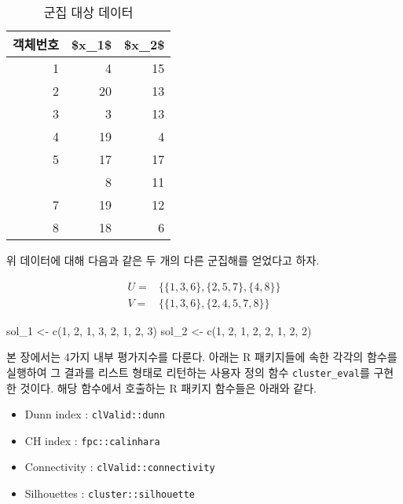 \documentclass[
]{book}
\newenvironment{Shaded}{\begin{snugshade}}{\end{snugshade}}
\newcommand{\DecValTok}[1]{\textcolor[rgb]{0.00,0.00,0.81}{#1}}
\newcommand{\FunctionTok}[1]{\textcolor[rgb]{0.00,0.00,0.00}{#1}}
\newcommand{\NormalTok}[1]{#1}
\newcommand{\OtherTok}[1]{\textcolor[rgb]{0.56,0.35,0.01}{#1}}
\providecommand{\tightlist}{%
  \setlength{\itemsep}{0pt}\setlength{\parskip}{0pt}}
\begin{document}
\begin{table}

\caption{\label{tab:cluster-eval-data}군집 대상 데이터}
\centering
\begin{tabular}[t]{rrr}
\toprule
객체번호 & \$x\_1\$ & \$x\_2\$\\
\midrule
1 & 4 & 15\\
2 & 20 & 13\\
3 & 3 & 13\\
4 & 19 & 4\\
5 & 17 & 17\\
\addlinespace
6 & 8 & 11\\
7 & 19 & 12\\
8 & 18 & 6\\
\bottomrule
\end{tabular}
\end{table}

위 데이터에 대해 다음과 같은 두 개의 다른 군집해를 얻었다고 하자.

\begin{equation}
\begin{split}
U =& \{ \{1, 3, 6\}, \{2, 5, 7\}, \{4, 8\} \}\\
V =& \{ \{1, 3, 6\}, \{2, 4, 5, 7, 8\} \}
\end{split}
\label{eq:cluster-eval-two-solutions}
\end{equation}

\begin{Shaded}
\begin{Highlighting}[]
\NormalTok{sol\_1 }\OtherTok{\textless{}{-}} \FunctionTok{c}\NormalTok{(}\DecValTok{1}\NormalTok{, }\DecValTok{2}\NormalTok{, }\DecValTok{1}\NormalTok{, }\DecValTok{3}\NormalTok{, }\DecValTok{2}\NormalTok{, }\DecValTok{1}\NormalTok{, }\DecValTok{2}\NormalTok{, }\DecValTok{3}\NormalTok{)}
\NormalTok{sol\_2 }\OtherTok{\textless{}{-}} \FunctionTok{c}\NormalTok{(}\DecValTok{1}\NormalTok{, }\DecValTok{2}\NormalTok{, }\DecValTok{1}\NormalTok{, }\DecValTok{2}\NormalTok{, }\DecValTok{2}\NormalTok{, }\DecValTok{1}\NormalTok{, }\DecValTok{2}\NormalTok{, }\DecValTok{2}\NormalTok{)}
\end{Highlighting}
\end{Shaded}

본 장에서는 4가지 내부 평가지수를 다룬다. 아래는 R 패키지들에 속한 각각의 함수를 실행하여 그 결과를 리스트 형태로 리턴하는 사용자 정의 함수 \texttt{cluster\_eval}를 구현한 것이다. 해당 함수에서 호출하는 R 패키지 함수들은 아래와 같다.

\begin{itemize}
\tightlist
\item
  Dunn index \citep{dunn1973fuzzy}: \texttt{clValid::dunn}
\item
  CH index \citep{calinski1974dendrite}: \texttt{fpc::calinhara}
\item
  Connectivity \citep{handl2005exploiting}: \texttt{clValid::connectivity}
\item
  Silhouettes \citep{rousseeuw1987silhouettes}: \texttt{cluster::silhouette}
\end{itemize}
\end{document}
